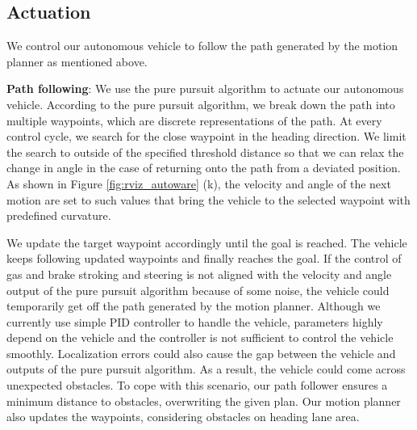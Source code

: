 \subsection{Actuation}
\label{sec:actuation}
We control our autonomous vehicle to follow the path generated by the motion planner as mentioned above.

\textbf{Path following}:
We use the pure pursuit algorithm \cite{coulter1992implementation} to actuate our autonomous vehicle.
According to the pure pursuit algorithm, we break down the path into multiple waypoints, which are discrete representations of the path.
At every control cycle, we search for the close waypoint in the heading direction.
We limit the search to outside of the specified threshold distance so that we can relax the change in angle in the case of returning onto the path from a deviated position.
As shown in Figure \ref{fig:rviz_autoware} (k), the velocity and angle of the next motion are set to such values that bring the vehicle to the selected waypoint with predefined curvature.

We update the target waypoint accordingly until the goal is reached.
The vehicle keeps following updated waypoints and finally reaches the goal.
If the control of gas and brake stroking and steering is not aligned with the velocity and angle output of the pure pursuit algorithm because of some noise, the vehicle could temporarily get off the path generated by the motion planner.
Although we currently use simple PID controller to handle the vehicle, parameters highly depend on the vehicle and the controller is not sufficient to control the vehicle smoothly.
Localization errors could also cause the gap between the vehicle and outputs of the pure pursuit algorithm.
As a result, the vehicle could come across unexpected obstacles.
To cope with this scenario, our path follower ensures a minimum distance to obstacles, overwriting the given plan.
Our motion planner also updates the waypoints, considering obstacles on heading lane area.
